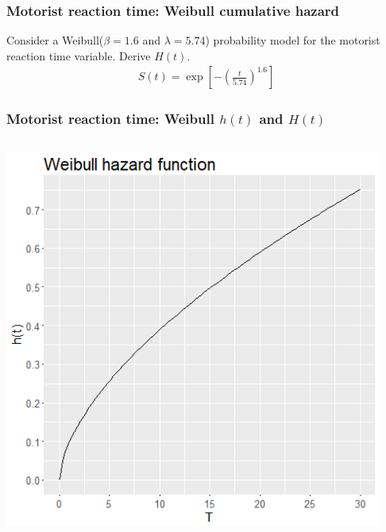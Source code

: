\begin{frame}
\begin{columns}
\end{columns}
\end{frame}

\begin{frame}
\frametitle{Motorist reaction time: Weibull cumulative hazard}
Consider a Weibull($\beta=1.6$ and $\lambda=5.74$) probability model for the motorist reaction time variable.  Derive $H(t)$.
\begin{eqnarray}
S(t)=\exp\left[ -\left(\frac{t}{5.74} \right)^{1.6} \right] \nonumber
\end{eqnarray}
\vskip200pt
\end{frame}

\begin{frame}
\frametitle{Motorist reaction time: Weibull $h(t)$ and $H(t)$}
\begin{columns}
\includegraphics[width=0.98\textwidth]{Figures/motorist_haz_weib.png}

\end{columns}
\end{frame}
